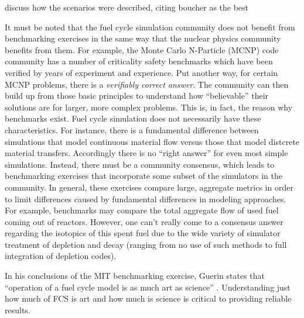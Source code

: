 discuss how the scenarios were described, citing boucher as the best

It must be noted that the fuel cycle simulation community does not benefit from
benchmarking exercises in the same way that the nuclear physics community
benefits from them. For example, the Monte Carlo N-Particle (MCNP) code
community has a number of criticality safety benchmarks \cite{wagner_mcnp:_1992}
which have been verified by years of experiment and experience. Put another way,
for certain MCNP problems, there is a \textit{verifiably correct answer}. The
community can then build up from those basic principles to understand how
``believable'' their solutions are for larger, more complex problems. This is,
in fact, the reason why benchmarks exist. Fuel cycle simulation does not
necessarily have these characteristics. For instance, there is a fundamental
difference between simulations that model continuous material flow versus those
that model distcrete material transfers. Accordingly there is no ``right
answer'' for even most simple simulations. Instead, there must be a community
consensus, which leads to benchmarking exercises that incorporate some subset of
the simulators in the community. In general, these exercises compare large,
aggregate metrics in order to limit differences caused by fundamental
differences in modeling approaches. For example, benchmarks may compare the
total aggregate flow of used fuel coming out of reactors. However, one can't
really come to a consensus answer regarding the isotopics of this spent fuel due
to the wide variety of simulator treatment of depletion and decay (ranging from
no use of such methods to full integration of depletion codes).

In his conclusions of the MIT benchmarking exercise, Guerin states that
``operation of a fuel cycle model is as much art as science''
\cite{guerin_benchmark_2009}. Understanding just how much of FCS is art and how
much is science is critical to providing reliable results. 
